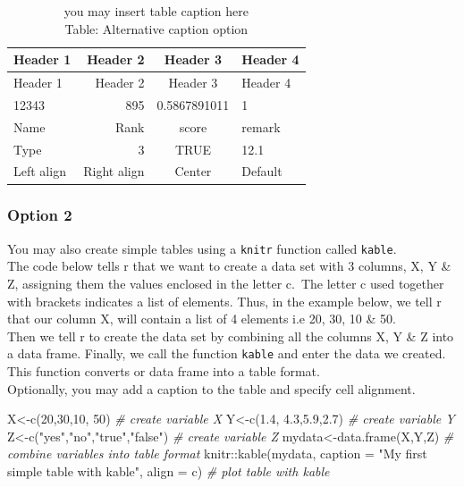 \documentclass[
]{book}
\newenvironment{Shaded}{\begin{snugshade}}{\end{snugshade}}
\newcommand{\AttributeTok}[1]{\textcolor[rgb]{0.77,0.63,0.00}{#1}}
\newcommand{\CommentTok}[1]{\textcolor[rgb]{0.56,0.35,0.01}{\textit{#1}}}
\newcommand{\DecValTok}[1]{\textcolor[rgb]{0.00,0.00,0.81}{#1}}
\newcommand{\FloatTok}[1]{\textcolor[rgb]{0.00,0.00,0.81}{#1}}
\newcommand{\FunctionTok}[1]{\textcolor[rgb]{0.00,0.00,0.00}{#1}}
\newcommand{\NormalTok}[1]{#1}
\newcommand{\OtherTok}[1]{\textcolor[rgb]{0.56,0.35,0.01}{#1}}
\newcommand{\SpecialCharTok}[1]{\textcolor[rgb]{0.00,0.00,0.00}{#1}}
\newcommand{\StringTok}[1]{\textcolor[rgb]{0.31,0.60,0.02}{#1}}
\begin{document}
\begin{longtable}[]{@{}lrcl@{}}
\caption{you may insert table caption here\\
Table: Alternative caption option}\tabularnewline
\toprule
Header 1 & Header 2 & Header 3 & Header 4 \\
\midrule
\endfirsthead
\toprule
Header 1 & Header 2 & Header 3 & Header 4 \\
\midrule
\endhead
12343 & 895 & 0.5867891011 & 1 \\
Name & Rank & score & remark \\
Type & 3 & TRUE & 12.1 \\
Left align & Right align & Center & Default \\
\bottomrule
\end{longtable}

\hypertarget{option-2}{%
\subsubsection{Option 2}\label{option-2}}

You may also create simple tables using a \texttt{knitr} function called \texttt{kable}.\\
The code below tells r that we want to create a data set with 3 columns, X, Y \& Z, assigning them the values enclosed in the letter c.~The letter c used together with brackets indicates a list of elements. Thus, in the example below, we tell r that our column X, will contain a list of 4 elements i.e 20, 30, 10 \& 50.\\
Then we tell r to create the data set by combining all the columns X, Y \& Z into a data frame.
Finally, we call the function \texttt{kable} and enter the data we created. This function converts or data frame into a table format.\\
Optionally, you may add a caption to the table and specify cell alignment.

\begin{Shaded}
\begin{Highlighting}[]
\NormalTok{X}\OtherTok{\textless{}{-}}\FunctionTok{c}\NormalTok{(}\DecValTok{20}\NormalTok{,}\DecValTok{30}\NormalTok{,}\DecValTok{10}\NormalTok{, }\DecValTok{50}\NormalTok{)    }\CommentTok{\# create variable X}
\NormalTok{Y}\OtherTok{\textless{}{-}}\FunctionTok{c}\NormalTok{(}\FloatTok{1.4}\NormalTok{, }\FloatTok{4.3}\NormalTok{,}\FloatTok{5.9}\NormalTok{,}\FloatTok{2.7}\NormalTok{)    }\CommentTok{\# create variable Y}
\NormalTok{Z}\OtherTok{\textless{}{-}}\FunctionTok{c}\NormalTok{(}\StringTok{"yes"}\NormalTok{,}\StringTok{"no"}\NormalTok{,}\StringTok{"true"}\NormalTok{,}\StringTok{"false"}\NormalTok{)   }\CommentTok{\# create variable Z}
\NormalTok{mydata}\OtherTok{\textless{}{-}}\FunctionTok{data.frame}\NormalTok{(X,Y,Z) }\CommentTok{\# combine variables into table format}
\NormalTok{knitr}\SpecialCharTok{::}\FunctionTok{kable}\NormalTok{(mydata, }\AttributeTok{caption =} \StringTok{"My first simple table with kable"}\NormalTok{, }\AttributeTok{align =} \StringTok{\textquotesingle{}c\textquotesingle{}}\NormalTok{) }\CommentTok{\# plot table with kable}
\end{Highlighting}
\end{Shaded}
\end{document}
